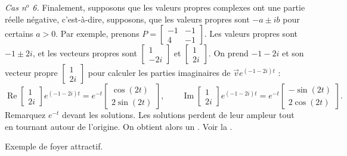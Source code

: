 \medskip

\emph{Cas n$^o$ 6.} Finalement, supposons que les valeurs propres complexes ont une partie réelle négative, c'est-à-dire, supposons, que les valeurs propres sont $-a \pm ib$ pour certains $a > 0$.
Par exemple, prenons $P = 
\left[ \begin{smallmatrix} -1 & -1 \\ 4 & -1 \end{smallmatrix} \right]$.
Les valeurs propres sont $-1\pm 2i$, et les vecteurs propres sont
$\left[ \begin{smallmatrix} 1 \\ -2i \end{smallmatrix} \right]$ et
$\left[ \begin{smallmatrix} 1 \\ 2i \end{smallmatrix} \right]$. On prend
$-1 - 2i$ et son vecteur propre
$\left[ \begin{smallmatrix} 1 \\ 2i \end{smallmatrix} \right]$ pour calculer les parties imaginaires de
$\vec{v} e^{(-1-2i)t}$ :
\begin{equation*}
\operatorname{Re}
\begin{bmatrix} 1 \\ 2i \end{bmatrix} e^{(-1-2i)t} =
e^{-t}
\begin{bmatrix} \cos (2t) \\ 2 \sin (2t) \end{bmatrix} ,
\qquad
\operatorname{Im}
\begin{bmatrix} 1 \\ 2i \end{bmatrix} e^{(-1-2i)t} =
e^{-t}
\begin{bmatrix} -\sin (2t) \\ 2 \cos (2t) \end{bmatrix} .
\end{equation*}
Remarquez $e^{-t}$ devant les solutions. Les solutions perdent de leur ampleur tout en tournant autour de l'origine. On obtient alors un \emph{}. Voir la .

\begin{myfig}
\capstart
{}
\caption{Exemple de foyer attractif.\label{pln:spiral-sinkfig}}
\end{myfig}

